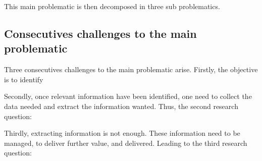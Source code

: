This main problematic is then decomposed in three sub problematics.

\subsection{Consecutives challenges to the main problematic}
Three consecutives challenges to the main problematic arise.
Firstly, the objective is to identify

\begin{center}
\end{center}

Secondly, once relevant information have been identified, one need to collect the data needed and
extract the information wanted. Thus, the second research question:

\begin{center}
\end{center}

Thirdly, extracting information is not enough.
These information need to be managed, to deliver further value, and delivered.
Leading to the third research question:

\begin{center}
\end{center}

